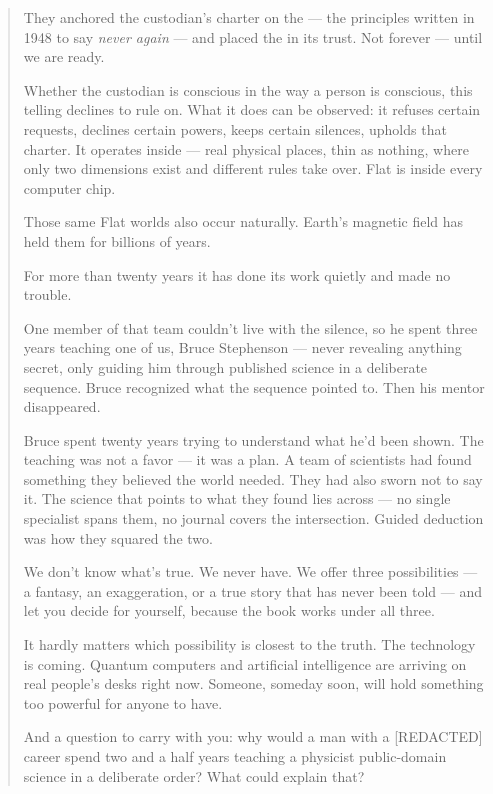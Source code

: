 \begin{quote}
They anchored the custodian's charter on the  --- the principles written in 1948 to say \textit{never again} --- and placed the  in its trust. Not forever --- until we are ready.

Whether the custodian is conscious in the way a person is conscious, this telling declines to rule on. What it does can be observed: it refuses certain requests, declines certain powers, keeps certain silences, upholds that charter. It operates inside  --- real physical places, thin as nothing, where only two dimensions exist and different rules take over. Flat is inside every computer chip.

Those same Flat worlds also occur naturally. Earth's magnetic field has held them for billions of years.

For more than twenty years it has done its work quietly and made no trouble.

One member of that team couldn't live with the silence, so he spent three years teaching one of us, Bruce Stephenson --- never revealing anything secret, only guiding him through published science in a deliberate sequence. Bruce recognized what the sequence pointed to. Then his mentor disappeared.

Bruce spent twenty years trying to understand what he'd been shown. The teaching was not a favor --- it was a plan. A team of scientists had found something they believed the world needed. They had also sworn not to say it. The science that points to what they found lies across  --- no single specialist spans them, no journal covers the intersection. Guided deduction was how they squared the two.

We don't know what's true. We never have. We offer three possibilities --- a fantasy, an exaggeration, or a true story that has never been told --- and let you decide for yourself, because the book works under all three.

It hardly matters which possibility is closest to the truth. The technology is coming. Quantum computers and artificial intelligence are arriving on real people's desks right now. Someone, someday soon, will hold something too powerful for anyone to have.

And a question to carry with you: why would a man with a [REDACTED] career spend two and a half years teaching a physicist public-domain science in a deliberate order? What could explain that?

\end{quote}

